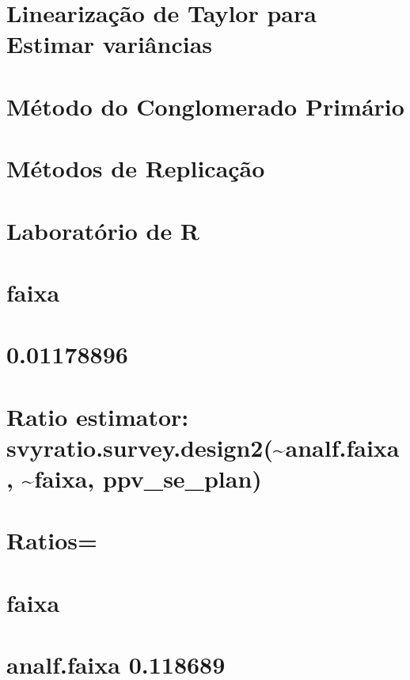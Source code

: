 \documentclass[]{book}
\theoremstyle{definition}
\theoremstyle{definition}
\theoremstyle{definition}
\theoremstyle{remark}
\begin{document}
\section{Linearização de Taylor para Estimar variâncias}\label{taylor}

\section{Método do Conglomerado
Primário}\label{metodo-do-conglomerado-primario}

\section{Métodos de Replicação}\label{metodos-de-replicacao}

\section{Laboratório de R}\label{laboratorio-de-r}

\section{faixa}\label{faixa}

\section{0.01178896}\label{section-10}

\section{Ratio estimator:
svyratio.survey.design2(\textasciitilde{}analf.faixa,
\textasciitilde{}faixa,
ppv\_se\_plan)}\label{ratio-estimator-svyratio.survey.design2analf.faixa-faixa-ppv_se_plan}

\section{Ratios=}\label{ratios-2}

\section{faixa}\label{faixa-1}

\section{analf.faixa 0.118689}\label{analf.faixa-0.118689}
\end{document}
